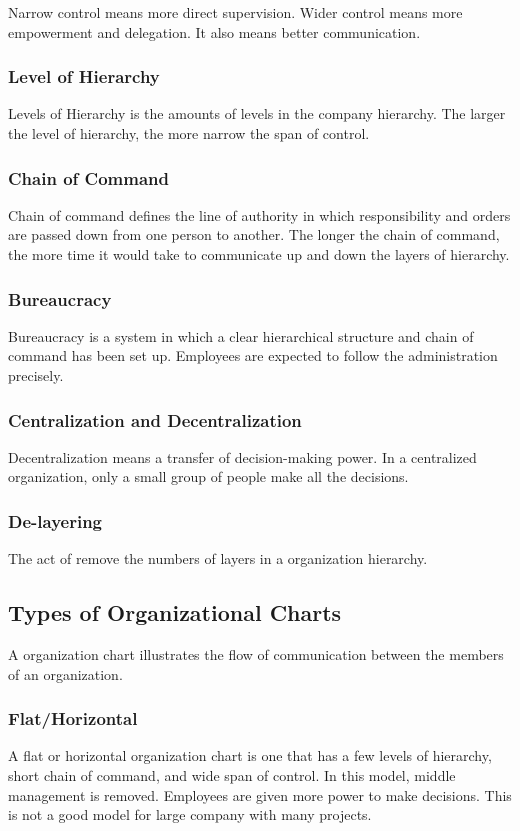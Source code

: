 \documentclass{standalone}
\begin{document}
Narrow control means more direct supervision.
Wider control means more empowerment and delegation.
It also means better communication.

\subsubsection{Level of Hierarchy}
Levels of Hierarchy is the amounts of levels in the company hierarchy.
The larger the level of hierarchy, the more narrow the span of control.

\subsubsection{Chain of Command}
Chain of command defines the line of authority in which responsibility and orders are passed down from one person to another.
The longer the chain of command, the more time it would take to communicate up and down the layers of hierarchy.

\subsubsection{Bureaucracy}
Bureaucracy is a system in which a clear hierarchical structure and chain of command has been set up.
Employees are expected to follow the administration precisely.

\subsubsection{Centralization and Decentralization}
Decentralization means a transfer of decision-making power.
In a centralized organization, only a small group of people make all the decisions.

\subsubsection{De-layering}
The act of remove the numbers of layers in a organization hierarchy.

\subsection{Types of Organizational Charts}
A organization chart illustrates the flow of communication between the members of an organization.

\subsubsection{Flat/Horizontal}
A flat or horizontal organization chart is one that has a few levels of hierarchy, short chain of command, and wide span of control.
In this model, middle management is removed.
Employees are given more power to make decisions.
This is not a good model for large company with many projects.
\end{document}
